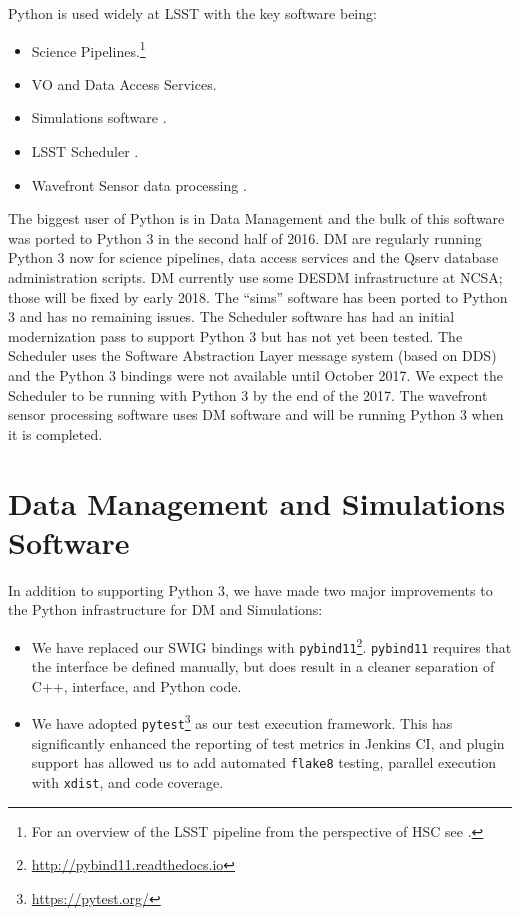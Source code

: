 \documentclass[11pt,twoside]{article}
\begin{document}
Python is used widely at LSST with the key software being:
\begin{itemize}
\item Science Pipelines.\footnote{For an overview of the LSST pipeline from the perspective of HSC see \citet{2017arXiv170506766B}.}
\item VO and Data Access Services.
\item Simulations software \citep{2014SPIE.9150E..14C}.
\item LSST Scheduler \citep{2016SPIE.9910E..13D}.
\item Wavefront Sensor data processing \citep{2016SPIE.9906E..3BT}.
\end{itemize}
The biggest user of Python is in Data Management \citep[DM;][]{O3-1_adassxxv} and the bulk of this software was ported to Python 3 in the second half of 2016.
DM are regularly running Python 3 now for science pipelines, data access services and the Qserv database administration scripts.
DM currently use some DESDM infrastructure at NCSA; those will be fixed by early 2018.
The ``sims'' software has been ported to Python 3 and has no remaining issues.
The Scheduler software has had an initial modernization pass to support Python 3 but has not yet been tested.
The Scheduler uses the Software Abstraction Layer \citep[SAL;][]{2016SPIE.9906E..5CM} message system (based on DDS) \citep{2016SPIE.9911E..25R} and the Python 3 bindings were not available until October 2017.
We expect the Scheduler to be running with Python 3 by the end of the 2017.
The wavefront sensor processing software uses DM software and will be running Python 3 when it is completed.

\section{Data Management and Simulations Software}

In addition to supporting Python 3, we have made two major improvements to the Python infrastructure for DM and Simulations:
\begin{itemize}
\item We have replaced our SWIG bindings \citep{beazley2003automated} with \texttt{pybind11}\footnote{\url{http://pybind11.readthedocs.io}}.
      \texttt{pybind11} requires that the interface be defined manually, but does result in a cleaner separation of C++, interface, and Python code.
\item We have adopted \texttt{pytest}\footnote{\url{https://pytest.org/}} as our test execution framework.
      This has significantly enhanced the reporting of test metrics in Jenkins CI, and plugin support has allowed us to add automated \texttt{flake8} testing, parallel execution with \texttt{xdist}, and code coverage.
\end{itemize}
\end{document}

